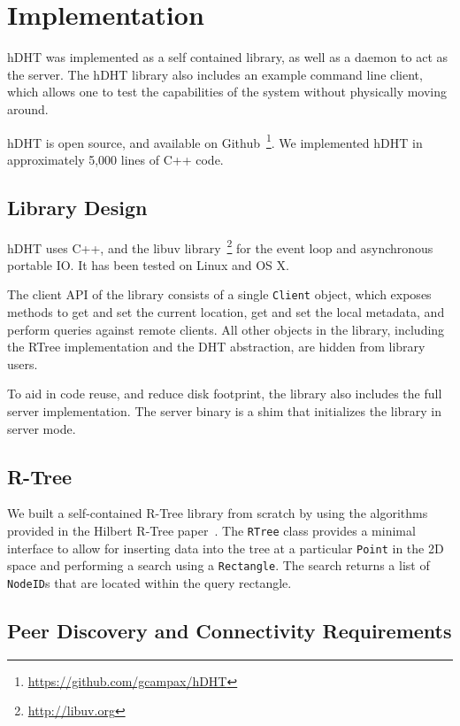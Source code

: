 \section{Implementation} \label{section:implementation}

hDHT was implemented as a self contained library, as well as a daemon to act as the server.
The hDHT library also includes an example command line client, which allows one to test the capabilities of the system without physically moving around.

hDHT is open source, and available on Github~\footnote{\url{https://github.com/gcampax/hDHT}}. We implemented hDHT in approximately 5,000 lines of C++ code.

\subsection{Library Design}

hDHT uses C++, and the libuv library~\footnote{\url{http://libuv.org}} for the event loop and asynchronous portable IO.
It has been tested on Linux and OS X.

The client API of the library consists of a single \texttt{Client} object, which exposes methods to get and set the current location, get and set the local metadata, and perform queries against remote clients.
All other objects in the library, including the RTree implementation and the DHT abstraction, are hidden from library users.

To aid in code reuse, and reduce disk footprint, the library also includes the full server implementation. The server binary is a shim that initializes the library in server mode.

\subsection{R-Tree}
We built a self-contained R-Tree library from scratch by using the algorithms provided in the Hilbert R-Tree paper~\cite{kamel1993hilbert}. The \texttt{RTree} class provides a minimal interface to allow for inserting data
into the tree at a particular \texttt{Point} in the 2D space and performing a search using a \texttt{Rectangle}. The search returns a list of \texttt{NodeID}s that are located within the query rectangle.

\subsection{Peer Discovery and Connectivity Requirements}

